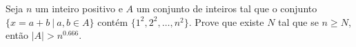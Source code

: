 Seja $n$ um inteiro positivo e $A$ um conjunto de inteiros tal que o conjunto $\{x = a + b\ |\ a, b \in A\}$ contém $\{1^2, 2^2, \dots, n^2\}$. Prove que existe $N$ tal que se $n \ge N$, então $|A| > n^{0.666}$.
